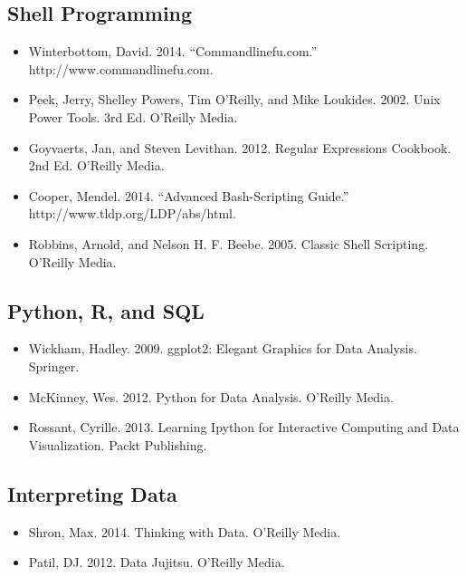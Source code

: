 \documentclass[
]{book}
\providecommand{\tightlist}{%
  \setlength{\itemsep}{0pt}\setlength{\parskip}{0pt}}
\theoremstyle{definition}
\theoremstyle{definition}
\theoremstyle{definition}
\theoremstyle{remark}
\begin{document}
\hypertarget{shell-programming}{%
\subsection{Shell Programming}\label{shell-programming}}

\begin{itemize}
\tightlist
\item
  Winterbottom, David. 2014. ``Commandlinefu.com.'' http://www.commandlinefu.com.
\item
  Peek, Jerry, Shelley Powers, Tim O'Reilly, and Mike Loukides. 2002. Unix Power Tools. 3rd Ed. O'Reilly Media.
\item
  Goyvaerts, Jan, and Steven Levithan. 2012. Regular Expressions Cookbook. 2nd Ed. O'Reilly Media.
\item
  Cooper, Mendel. 2014. ``Advanced Bash-Scripting Guide.'' http://www.tldp.org/LDP/abs/html.
\item
  Robbins, Arnold, and Nelson H. F. Beebe. 2005. Classic Shell Scripting. O'Reilly Media.
\end{itemize}

\hypertarget{python-r-and-sql}{%
\subsection{Python, R, and SQL}\label{python-r-and-sql}}

\begin{itemize}
\tightlist
\item
  Wickham, Hadley. 2009. ggplot2: Elegant Graphics for Data Analysis. Springer.
\item
  McKinney, Wes. 2012. Python for Data Analysis. O'Reilly Media.
\item
  Rossant, Cyrille. 2013. Learning Ipython for Interactive Computing and Data Visualization. Packt Publishing.
\end{itemize}

\hypertarget{interpreting-data}{%
\subsection{Interpreting Data}\label{interpreting-data}}

\begin{itemize}
\tightlist
\item
  Shron, Max. 2014. Thinking with Data. O'Reilly Media.
\item
  Patil, DJ. 2012. Data Jujitsu. O'Reilly Media.
\end{itemize}
\end{document}
